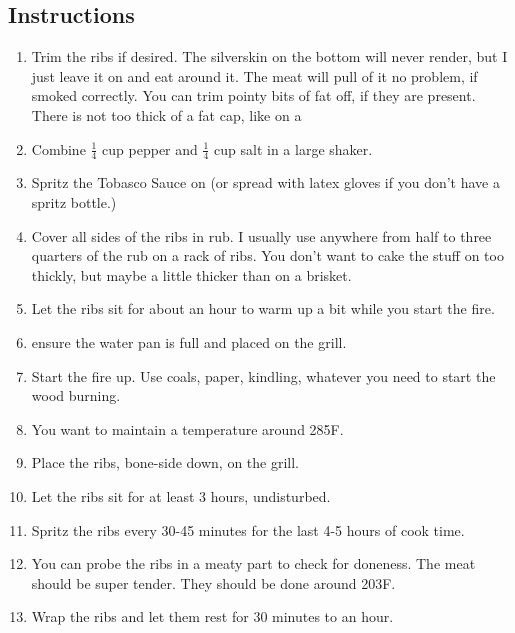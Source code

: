 \begin{multicols}{2}
\subsection*{Instructions}
\begin{enumerate}
    \item Trim the ribs if desired. The silverskin on the bottom will never render, but I just leave it on and eat around it. The meat will pull of it no problem, if smoked correctly. You can trim pointy bits of fat off, if they are present. There is not too thick of a fat cap, like on a 
    \item Combine \( \frac{1}{4} \) cup pepper and \( \frac{1}{4} \) cup salt in a large shaker.
    \item Spritz the Tobasco Sauce on (or spread with latex gloves if you don't have a spritz bottle.)
    \item Cover all sides of the ribs in rub. I usually use anywhere from half to three quarters of the rub on a rack of ribs. You don't want to cake the stuff on too thickly, but maybe a little thicker than on a brisket.
    \item Let the ribs sit for about an hour to warm up a bit while you start the fire.
    \item ensure the water pan is full and placed on the grill.
    \item Start the fire up. Use coals, paper, kindling, whatever you need to start the wood burning.
    \item You want to maintain a temperature around 285F.
    \item Place the ribs, bone-side down, on the grill.
    \item Let the ribs sit for at least 3 hours, undisturbed.
    \item Spritz the ribs every 30-45 minutes for the last 4-5 hours of cook time.
    \item You can probe the ribs in a meaty part to check for doneness. The meat should be super tender. They should be done around 203F.
    \item Wrap the ribs and let them rest for 30 minutes to an hour.

\end{enumerate}


\end{multicols}
